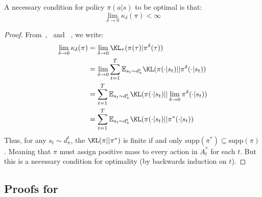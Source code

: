 \begin{corollary}
    A necessary condition for policy $\pi(a|s)$ to be optimal is that:
    \[
    \lim_{\delta \to 0} \kappa_\delta(\pi) < \infty
    \]
\end{corollary}
\begin{proof}
    From~,~ and ~, we write:
    \begin{align*}
    \lim_{\delta \to 0} \kappa_\delta(\pi) &= \lim_{\delta \to 0} \KL_\tau(\pi(\tau)|\pi^\delta(\tau)) \\
    &= \lim_{\delta \to 0} \sum_{t = 1}^T \mathbb{E}_{s_t \sim d^t_\pi} \KL(\pi(\cdot|s_t) || \pi^\delta(\cdot|s_t)) \\
    &= \sum_{t = 1}^T \mathbb{E}_{s_t \sim d^t_\pi} \KL(\pi(\cdot|s_t) || \lim_{\delta \to 0} \pi^\delta(\cdot|s_t)) \\
    &= \sum_{t = 1}^T \mathbb{E}_{s_t \sim d^t_\pi} \KL(\pi(\cdot|s_t) || \pi^*(\cdot|s_t))
    \end{align*}
    Thus, for any $s_t \sim d^t_\pi$, the $\KL(\pi|| \pi^*)$ is finite if and only $\text{supp}(\pi^*) \subseteq \text{supp}(\pi)$. Meaning that $\pi$ must assign positive mass to every action in $A_t^*$ for each $t$. But this is a necessary condition for optimality (by backwards induction on $t$).
\end{proof}

\subsection{Proofs for~}


